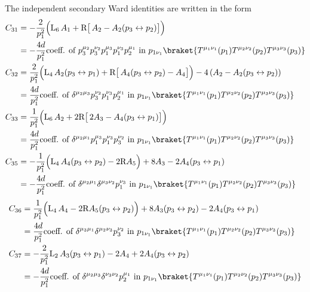 \documentclass[a4paper,11pt,openright,twoside]{book}
\numberwithin{equation}{section}
\begin{document}
{{{The independent secondary Ward identities are written in the form
\begin{align}
	C_{31}&= -\frac{2}{p_1^2}\Bigl( \textup{L}_6\, A_1 + \textup{R}\bigl[\, A_2-A_2(p_3\leftrightarrow p_2)\bigr]\Bigr)\notag\\
	&=-\frac{4d}{p_1^2}\text{coeff. of } p_3^{\mu_2}p_3^{\nu_2}p_1^{\mu_3}p_1^{\nu_3}p_2^{\mu_1} \text{ in } p_{1\nu_1}\braket{ T^{\mu_1\nu_1}(p_1)T^{\mu_2\nu_2}(p_2)T^{\mu_3\nu_3}(p_3)}\\
	C_{32}&= \frac{2}{p_1^2}\Bigl( \textup{L}_4\, A_2(p_3\leftrightarrow p_1) + \textup{R}\bigl[\, A_4(p_3\leftrightarrow p_2)-A_4\bigr]\Bigr)-4\left(A_2-A_2(p_3\leftrightarrow p_2)\right)\nonumber\\
	&=\frac{4d}{p_1^2}\text{coeff. of } \delta^{\mu_2\mu_3}p_3^{\nu_2}p_1^{\nu_3}p_2^{\mu_1} \text{ in } p_{1\nu_1}\braket{ T^{\mu_1\nu_1}(p_1)T^{\mu_2\nu_2}(p_2)T^{\mu_3\nu_3}(p_3)}\\
	C_{33}&= \frac{1}{p_1^2}\Bigl( \textup{L}_6\, A_2 + 2\textup{R}\bigl[\,2A_3-A_4(p_3\leftrightarrow p_1)\bigr]\Bigr)\notag\\
	&=\frac{4d}{p_1^2}\text{coeff. of } \delta^{\mu_2\mu_1}p_1^{\mu_3}p_1^{\nu_3}p_3^{\nu_2} \text{ in } p_{1\nu_1}\braket{ T^{\mu_1\nu_1}(p_1)T^{\mu_2\nu_2}(p_2)T^{\mu_3\nu_3}(p_3)}\\
	C_{35}&= -\frac{1}{p_1^2}\Bigl( \textup{L}_4\, A_4(p_3\leftrightarrow p_2)  - 2\textup{R}A_5\Bigr)+8A_3-2A_4(p_3\leftrightarrow p_1)\notag\\
	&=-\frac{4d}{p_1^2}\text{coeff. of } \delta^{\mu_2\mu_1}\delta^{\mu_3\nu_2}p_1^{\nu_3} \text{ in } p_{1\nu_1}\braket{ T^{\mu_1\nu_1}(p_1)T^{\mu_2\nu_2}(p_2)T^{\mu_3\nu_3}(p_3)}
\end{align}
\begin{align}
	C_{36}&= \frac{1}{p_1^2}\Bigl( \textup{L}_4\, A_4- 2\textup{R}A_5(p_3\leftrightarrow p_2)\Bigr)+8A_3(p_3\leftrightarrow p_2)-2A_4(p_3\leftrightarrow p_1)\notag\\
	&=\frac{4d}{p_1^2}\text{coeff. of } \delta^{\mu_3\mu_1}\delta^{\mu_2\nu_3}p_3^{\nu_2} \text{ in } p_{1\nu_1}\braket{ T^{\mu_1\nu_1}(p_1)T^{\mu_2\nu_2}(p_2)T^{\mu_3\nu_3}(p_3)}\\
	C_{37}&= -\frac{2}{p_1^2} \textup{L}_2\, A_3(p_3\leftrightarrow p_1)  -2A_4+2A_4(p_3\leftrightarrow p_2)\notag\\
	&=-\frac{4d}{p_1^2}\text{coeff. of } \delta^{\mu_2\mu_3}\delta^{\nu_3\nu_2}p_2^{\mu_1} \text{ in } p_{1\nu_1}\braket{ T^{\mu_1\nu_1}(p_1)T^{\mu_2\nu_2}(p_2)T^{\mu_3\nu_3}(p_3)}
\end{align}
}}}
\end{document}

